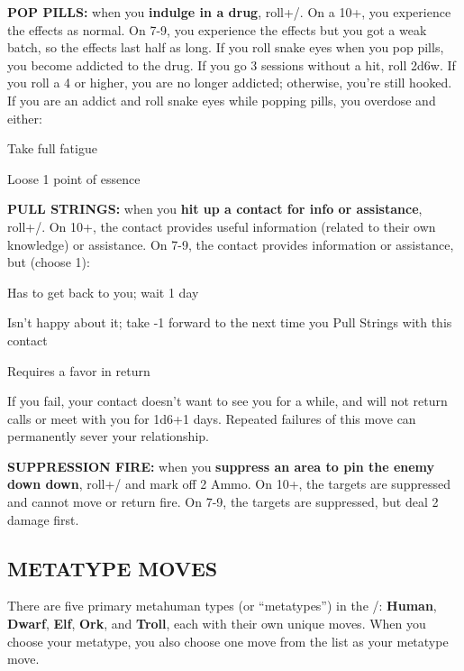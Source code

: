 \documentclass[oneside,10pt]{article}
\begin{document}
\begin{multicols}{2}
\label{move_poppills}
\textbf{POP PILLS:} when you \textbf{indulge in a drug},
roll+\essence/. On a 10+, you experience the effects as normal. On
7-9, you experience the effects but you got a weak batch, so the
effects last half as long.  If you roll snake eyes when you pop pills,
you become addicted to the drug. If you go 3 sessions without a hit,
roll 2d6w. If you roll a 4 or higher, you are no longer addicted;
otherwise, you’re still hooked. If you are an addict and roll snake
eyes while popping pills, you overdose and either:

\begin{dent}
  
  \tcirc{} Take full fatigue

  \tcirc{} Loose 1 point of essence
  
\end{dent}

\label{move_pullstrings}
\textbf{PULL STRINGS:} when you \textbf{hit up a contact for info or
  assistance}, roll+\flair/. On 10+, the contact provides useful
information (related to their own knowledge) or assistance.  On 7-9,
the contact provides information or assistance, but (choose 1):
\begin{dent}

\tcirc{} Has to get back to you; wait 1 day

\tcirc{} Isn’t happy about it; take -1 forward to the next time
you Pull Strings with this contact

\tcirc{} Requires a favor in return
\end{dent}

If you fail, your contact doesn’t want to see you for a while, and
will not return calls or meet with you for 1d6+1 days.  Repeated
failures of this move can permanently sever your relationship.

\label{move_suppressionfire}
\textbf{SUPPRESSION FIRE:} when you \textbf{suppress an area to pin
  the enemy down down}, roll+\mastery/ and mark off 2 Ammo. On 10+,
the targets are suppressed and cannot move or return fire. On 7-9, the
targets are suppressed, but deal 2 damage first.


\subsection{METATYPE MOVES}
\label{metatypes}

There are five primary metahuman types (or ``metatypes'') in the \SW/:
\textbf{Human}, \textbf{Dwarf}, \textbf{Elf}, \textbf{Ork}, and
\textbf{Troll}, each with their own unique moves. When you choose your
metatype, you also choose one move from the list as your metatype
move.


\end{multicols}
\end{document}
